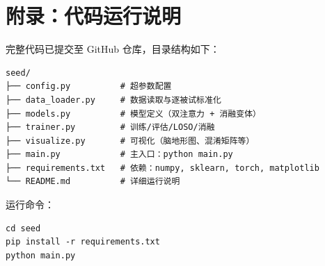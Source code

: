 \documentclass[12pt,a4paper]{ctexart}
\begin{document}
\section*{附录：代码运行说明}

完整代码已提交至 GitHub 仓库，目录结构如下：
\begin{verbatim}
seed/
├── config.py          # 超参数配置
├── data_loader.py     # 数据读取与逐被试标准化
├── models.py          # 模型定义（双注意力 + 消融变体）
├── trainer.py         # 训练/评估/LOSO/消融
├── visualize.py       # 可视化（脑地形图、混淆矩阵等）
├── main.py            # 主入口：python main.py
├── requirements.txt   # 依赖：numpy, sklearn, torch, matplotlib
└── README.md          # 详细运行说明
\end{verbatim}

运行命令：
\begin{verbatim}
cd seed
pip install -r requirements.txt
python main.py
\end{verbatim}
\end{document}
